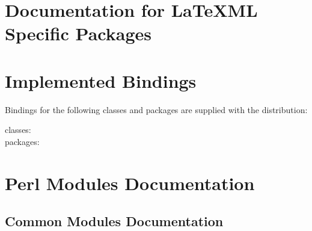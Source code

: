 \documentclass{book}
\begin{document}
\chapter[Packages]{Documentation for LaTeXML Specific Packages}\label{packages}
{\let\pod=\URL


}

\chapter[Bindings]{Implemented Bindings}\label{included.bindings}
Bindings for the following classes and packages are supplied with the distribution:
\begin{description}
\item[classes:] \CurrentClasses
\item[packages:] \CurrentPackages
\end{description}

\chapter[Modules]{Perl  Modules Documentation}\label{modules}





\section[Common Modules]{Common Modules Documentation}\label{modules.common}



















\end{document}
